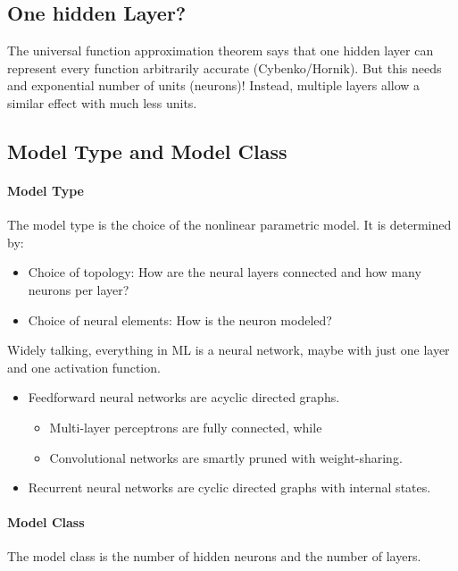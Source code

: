 \documentclass[a4paper, 11pt, accentcolor = tud3b]{tudreport}
\begin{document}
			\subsection{One hidden Layer?}
				The universal function approximation theorem says that one hidden layer can represent every function arbitrarily accurate (Cybenko/Hornik). But this needs and exponential number of units (neurons)! Instead, multiple layers allow a similar effect with much less units.

			\subsection{Model Type and Model Class}
				\paragraph{Model Type}
					The model type is the choice of the nonlinear parametric model. It is determined by:
					\begin{itemize}
						\item Choice of topology: How are the neural layers connected and how many neurons per layer?
						\item Choice of neural elements: How is the neuron modeled?
					\end{itemize}
					Widely talking, everything in ML is a neural network, maybe with just one layer and one activation function.
					
					\begin{itemize}
						\item Feedforward neural networks are acyclic directed graphs.
							\begin{itemize}
								\item Multi-layer perceptrons are fully connected, while
								\item Convolutional networks are smartly pruned with weight-sharing.
							\end{itemize}
						\item Recurrent neural networks are cyclic directed graphs with internal states.
					\end{itemize}
				
				\paragraph{Model Class}
					The model class is the number of hidden neurons and the number of layers.
\end{document}
